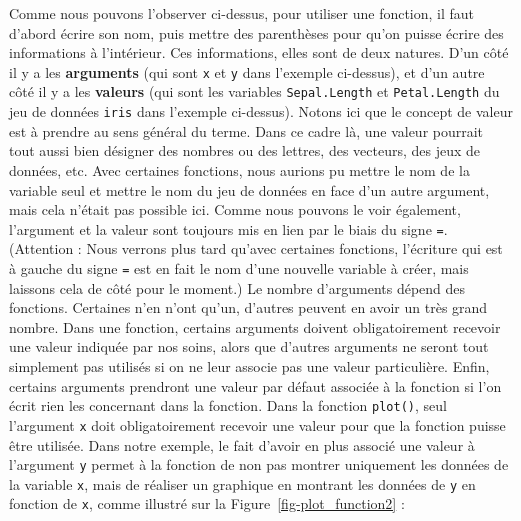 \documentclass[
  letterpaper,
]{book}
\newenvironment{Shaded}{\begin{snugshade}}{\end{snugshade}}
\newcommand{\AttributeTok}[1]{\textcolor[rgb]{0.40,0.45,0.13}{#1}}
\newcommand{\FunctionTok}[1]{\textcolor[rgb]{0.28,0.35,0.67}{#1}}
\newcommand{\NormalTok}[1]{\textcolor[rgb]{0.00,0.23,0.31}{#1}}
\newcommand{\SpecialCharTok}[1]{\textcolor[rgb]{0.37,0.37,0.37}{#1}}
\begin{document}
Comme nous pouvons l'observer ci-dessus, pour utiliser une fonction, il
faut d'abord écrire son nom, puis mettre des parenthèses pour qu'on
puisse écrire des informations à l'intérieur. Ces informations, elles
sont de deux natures. D'un côté il y a les \textbf{arguments} (qui sont
\texttt{x} et \texttt{y} dans l'exemple ci-dessus), et d'un autre côté
il y a les \textbf{valeurs} (qui sont les variables
\texttt{Sepal.Length} et \texttt{Petal.Length} du jeu de données
\texttt{iris} dans l'exemple ci-dessus). Notons ici que le concept de
valeur est à prendre au sens général du terme. Dans ce cadre là, une
valeur pourrait tout aussi bien désigner des nombres ou des lettres, des
vecteurs, des jeux de données, etc. Avec certaines fonctions, nous
aurions pu mettre le nom de la variable seul et mettre le nom du jeu de
données en face d'un autre argument, mais cela n'était pas possible ici.
Comme nous pouvons le voir également, l'argument et la valeur sont
toujours mis en lien par le biais du signe \texttt{=}. (Attention : Nous
verrons plus tard qu'avec certaines fonctions, l'écriture qui est à
gauche du signe \texttt{=} est en fait le nom d'une nouvelle variable à
créer, mais laissons cela de côté pour le moment.) Le nombre d'arguments
dépend des fonctions. Certaines n'en n'ont qu'un, d'autres peuvent en
avoir un très grand nombre. Dans une fonction, certains arguments
doivent obligatoirement recevoir une valeur indiquée par nos soins,
alors que d'autres arguments ne seront tout simplement pas utilisés si
on ne leur associe pas une valeur particulière. Enfin, certains
arguments prendront une valeur par défaut associée à la fonction si l'on
écrit rien les concernant dans la fonction. Dans la fonction
\texttt{plot()}, seul l'argument \texttt{x} doit obligatoirement
recevoir une valeur pour que la fonction puisse être utilisée. Dans
notre exemple, le fait d'avoir en plus associé une valeur à l'argument
\texttt{y} permet à la fonction de non pas montrer uniquement les
données de la variable \texttt{x}, mais de réaliser un graphique en
montrant les données de \texttt{y} en fonction de \texttt{x}, comme
illustré sur la Figure~\ref{fig-plot_function2} :

\begin{Shaded}
\end{Shaded}
\end{document}
